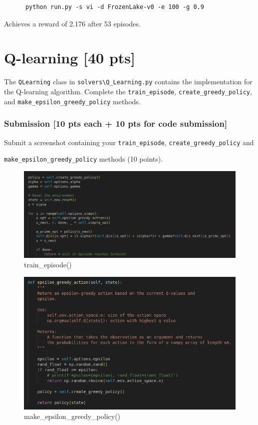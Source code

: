 \documentclass[a4paper]{article}
\theoremstyle{definition}
\begin{document}
\begin{verbatim}
      python run.py -s vi -d FrozenLake-v0 -e 100 -g 0.9  
\end{verbatim}
Achieves a reward of 2.176 after 53 episodes.

\section{Q-learning [40 pts]}

The \verb|QLearning| class in \verb|solvers\Q_Learning.py| contains the implementation for the Q-learning algorithm. Complete the \verb|train_episode|, \verb|create_greedy_policy|,  and \verb|make_epsilon_greedy_policy| methods.

\subsubsection*{Submission [10 pts each + 10 pts for code submission]}

Submit a screenshot containing your \verb|train_episode|, \verb|create_greedy_policy| and 

\verb|make_epsilon_greedy_policy| methods (10 points).

\begin{figure}[H]
    \centering
    \includegraphics[width=6in]{3_train_episode.png}
    \caption{train\_episode()}
    \label{fig:gan_q1_loss}
\end{figure}

\begin{figure}[H]
    \centering
    \includegraphics[width=6in]{3_make_epsilon_greedy_policy.png}
    \caption{make\_epsilon\_greedy\_policy()}
    \label{fig:gan_q1_loss}
\end{figure}
\end{document}
